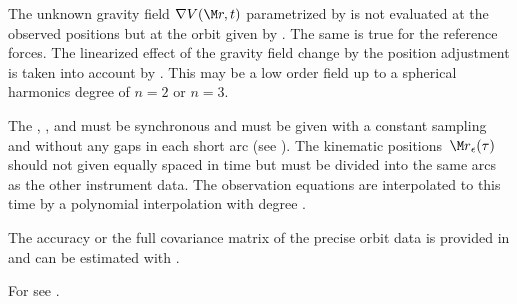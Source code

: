 The unknown gravity field $\nabla V(\M r, t)$ parametrized by 
is not evaluated at the observed positions but at the orbit given by .
The same is true for the reference forces. The linearized effect of the gravity field change by the position
adjustment is taken into account by . This may be a low order field up to a
spherical harmonics degree of $n=2$ or $n=3$.

The , , and 
must be synchronous and must be given with a constant sampling and without any gaps in each short arc
(see ).
The kinematic positions~${\M r}_\epsilon(\tau)$ should not given equally spaced in time
but must be divided into the same arcs as the other instrument data.
The observation equations are interpolated to this time by a polynomial interpolation
with degree .

The accuracy or the full covariance matrix of the precise orbit data is provided in
 and can be estimated with .

For  see .


